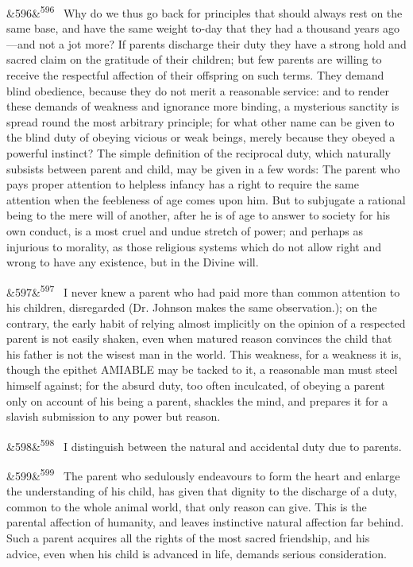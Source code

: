 \documentclass[12pt]{article}
\newcommand{\para}[1][]{\par\noindent\ifx&#1&\else\textsuperscript{\footnotesize #1}~\fi}
\begin{document}
\para[596] Why do we thus go back for principles that should always rest on the same base, and have the same weight to-day that they had a thousand years ago---and not a jot more? If parents discharge their duty they have a strong hold and sacred claim on the gratitude of their children; but few parents are willing to receive the respectful affection of their offspring on such terms. They demand blind obedience, because they do not merit a reasonable service: and to render these demands of weakness and ignorance more binding, a mysterious sanctity is spread round the most arbitrary principle; for what other name can be given to the blind duty of obeying vicious or weak beings, merely because they obeyed a powerful instinct? The simple definition of the reciprocal duty, which naturally subsists between parent and child, may be given in a few words: The parent who pays proper attention to helpless infancy has a right to require the same attention when the feebleness of age comes upon him. But to subjugate a rational being to the mere will of another, after he is of age to answer to society for his own conduct, is a most cruel and undue stretch of power; and perhaps as injurious to morality, as those religious systems which do not allow right and wrong to have any existence, but in the Divine will.

\para[597] I never knew a parent who had paid more than common attention to his children, disregarded (Dr. Johnson makes the same observation.); on the contrary, the early habit of relying almost implicitly on the opinion of a respected parent is not easily shaken, even when matured reason convinces the child that his father is not the wisest man in the world. This weakness, for a weakness it is, though the epithet AMIABLE may be tacked to it, a reasonable man must steel himself against; for the absurd duty, too often inculcated, of obeying a parent only on account of his being a parent, shackles the mind, and prepares it for a slavish submission to any power but reason.

\para[598] I distinguish between the natural and accidental duty due to parents.

\para[599] The parent who sedulously endeavours to form the heart and enlarge the understanding of his child, has given that dignity to the discharge of a duty, common to the whole animal world, that only reason can give. This is the parental affection of humanity, and leaves instinctive natural affection far behind. Such a parent acquires all the rights of the most sacred friendship, and his advice, even when his child is advanced in life, demands serious consideration.
\end{document}
